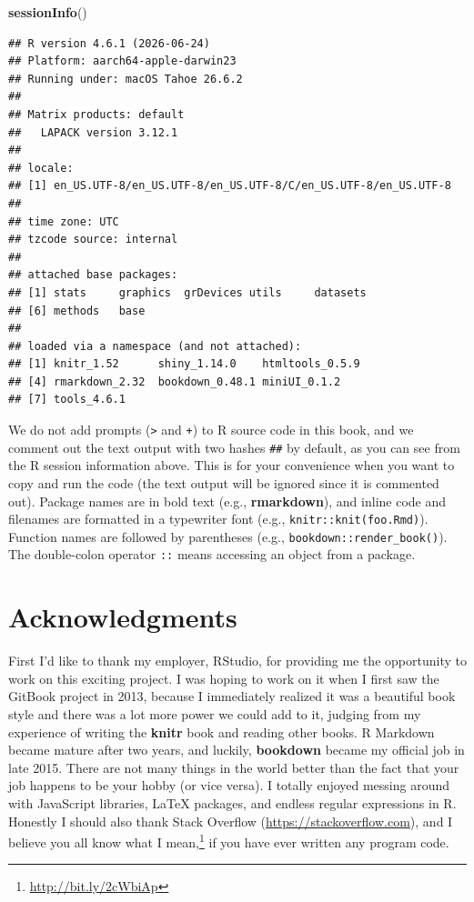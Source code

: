 \documentclass[
  12pt,
]{krantz}
\newenvironment{Shaded}{\begin{snugshade}}{\end{snugshade}}
\newcommand{\FunctionTok}[1]{\textcolor[rgb]{0.13,0.29,0.53}{\textbf{#1}}}
\newcommand{\NormalTok}[1]{#1}
\renewcommand{\href}[2]{#2\footnote{\url{#1}}}
\theoremstyle{definition}
\theoremstyle{definition}
\theoremstyle{definition}
\theoremstyle{definition}
\theoremstyle{remark}
\begin{document}
\begin{Shaded}
\begin{Highlighting}[]
\FunctionTok{sessionInfo}\NormalTok{()}
\end{Highlighting}
\end{Shaded}

\begin{verbatim}
## R version 4.6.1 (2026-06-24)
## Platform: aarch64-apple-darwin23
## Running under: macOS Tahoe 26.6.2
## 
## Matrix products: default
##   LAPACK version 3.12.1
## 
## locale:
## [1] en_US.UTF-8/en_US.UTF-8/en_US.UTF-8/C/en_US.UTF-8/en_US.UTF-8
## 
## time zone: UTC
## tzcode source: internal
## 
## attached base packages:
## [1] stats     graphics  grDevices utils     datasets 
## [6] methods   base     
## 
## loaded via a namespace (and not attached):
## [1] knitr_1.52      shiny_1.14.0    htmltools_0.5.9
## [4] rmarkdown_2.32  bookdown_0.48.1 miniUI_0.1.2   
## [7] tools_4.6.1
\end{verbatim}

We do not add prompts (\texttt{\textgreater{}} and \texttt{+}) to R source code in this book, and we comment out the text output with two hashes \texttt{\#\#} by default, as you can see from the R session information above. This is for your convenience when you want to copy and run the code (the text output will be ignored since it is commented out). Package names are in bold text (e.g., \textbf{rmarkdown}), and inline code and filenames are formatted in a typewriter font (e.g., \texttt{knitr::knit(\textquotesingle{}foo.Rmd\textquotesingle{})}). Function names are followed by parentheses (e.g., \texttt{bookdown::render\_book()}). The double-colon operator \texttt{::} means accessing an object from a package.

\section*{Acknowledgments}\label{acknowledgments}


First I'd like to thank my employer, RStudio, for providing me the opportunity to work on this exciting project. I was hoping to work on it when I first saw the GitBook project in 2013, because I immediately realized it was a beautiful book style and there was a lot more power we could add to it, judging from my experience of writing the \textbf{knitr} book \citep{xie2015} and reading other books. R Markdown became mature after two years, and luckily, \textbf{bookdown} became my official job in late 2015. There are not many things in the world better than the fact that your job happens to be your hobby (or vice versa). I totally enjoyed messing around with JavaScript libraries, LaTeX packages, and endless regular expressions in R. Honestly I should also thank Stack Overflow (\url{https://stackoverflow.com}), and I believe you all know \href{http://bit.ly/2cWbiAp}{what I mean,} if you have ever written any program code.
\end{document}
